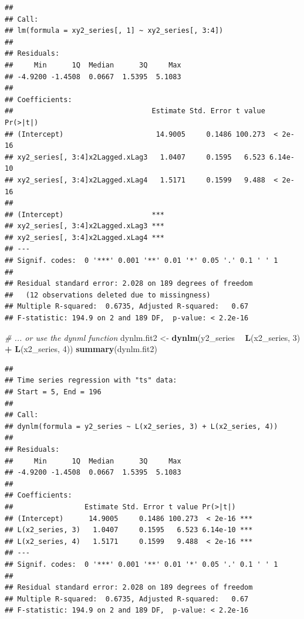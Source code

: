 \documentclass[
]{article}
\newenvironment{Shaded}{\begin{snugshade}}{\end{snugshade}}
\newcommand{\CommentTok}[1]{\textcolor[rgb]{0.56,0.35,0.01}{\textit{#1}}}
\newcommand{\DecValTok}[1]{\textcolor[rgb]{0.00,0.00,0.81}{#1}}
\newcommand{\KeywordTok}[1]{\textcolor[rgb]{0.13,0.29,0.53}{\textbf{#1}}}
\newcommand{\NormalTok}[1]{#1}
\newcommand{\OperatorTok}[1]{\textcolor[rgb]{0.81,0.36,0.00}{\textbf{#1}}}
\newcommand{\StringTok}[1]{\textcolor[rgb]{0.31,0.60,0.02}{#1}}
\begin{document}
\begin{verbatim}
## 
## Call:
## lm(formula = xy2_series[, 1] ~ xy2_series[, 3:4])
## 
## Residuals:
##     Min      1Q  Median      3Q     Max 
## -4.9200 -1.4508  0.0667  1.5395  5.1083 
## 
## Coefficients:
##                                 Estimate Std. Error t value Pr(>|t|)
## (Intercept)                      14.9005     0.1486 100.273  < 2e-16
## xy2_series[, 3:4]x2Lagged.xLag3   1.0407     0.1595   6.523 6.14e-10
## xy2_series[, 3:4]x2Lagged.xLag4   1.5171     0.1599   9.488  < 2e-16
##                                    
## (Intercept)                     ***
## xy2_series[, 3:4]x2Lagged.xLag3 ***
## xy2_series[, 3:4]x2Lagged.xLag4 ***
## ---
## Signif. codes:  0 '***' 0.001 '**' 0.01 '*' 0.05 '.' 0.1 ' ' 1
## 
## Residual standard error: 2.028 on 189 degrees of freedom
##   (12 observations deleted due to missingness)
## Multiple R-squared:  0.6735, Adjusted R-squared:   0.67 
## F-statistic: 194.9 on 2 and 189 DF,  p-value: < 2.2e-16
\end{verbatim}

\begin{Shaded}
\begin{Highlighting}[]
\CommentTok{# ... or use the dynml function}
\NormalTok{dynlm.fit2 <-}\StringTok{ }\KeywordTok{dynlm}\NormalTok{(y2_series }\OperatorTok{~}\StringTok{ }\KeywordTok{L}\NormalTok{(x2_series, }\DecValTok{3}\NormalTok{) }\OperatorTok{+}\StringTok{ }\KeywordTok{L}\NormalTok{(x2_series, }\DecValTok{4}\NormalTok{))}
\KeywordTok{summary}\NormalTok{(dynlm.fit2)}
\end{Highlighting}
\end{Shaded}

\begin{verbatim}
## 
## Time series regression with "ts" data:
## Start = 5, End = 196
## 
## Call:
## dynlm(formula = y2_series ~ L(x2_series, 3) + L(x2_series, 4))
## 
## Residuals:
##     Min      1Q  Median      3Q     Max 
## -4.9200 -1.4508  0.0667  1.5395  5.1083 
## 
## Coefficients:
##                 Estimate Std. Error t value Pr(>|t|)    
## (Intercept)      14.9005     0.1486 100.273  < 2e-16 ***
## L(x2_series, 3)   1.0407     0.1595   6.523 6.14e-10 ***
## L(x2_series, 4)   1.5171     0.1599   9.488  < 2e-16 ***
## ---
## Signif. codes:  0 '***' 0.001 '**' 0.01 '*' 0.05 '.' 0.1 ' ' 1
## 
## Residual standard error: 2.028 on 189 degrees of freedom
## Multiple R-squared:  0.6735, Adjusted R-squared:   0.67 
## F-statistic: 194.9 on 2 and 189 DF,  p-value: < 2.2e-16
\end{verbatim}
\end{document}
